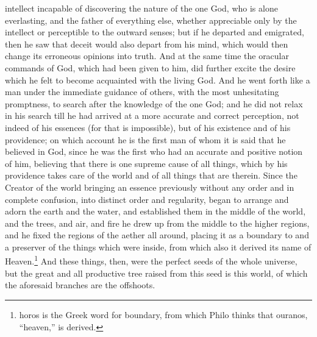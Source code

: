intellect incapable of discovering the nature of the one God, who is alone everlasting, and the
father of everything else, whether appreciable only by the intellect or perceptible to the outward
senses; but if he departed and emigrated, then he saw that deceit would also depart from his mind,
which would then change its erroneous opinions into truth. And at the same time the oracular
commands of God, which had been given to him, did further excite the desire which he felt to
become acquainted with the living God. And he went forth like a man under the immediate guidance
of others, with the most unhesitating promptness, to search after the knowledge of the one God;
and he did not relax in his search till he had arrived at a more accurate and correct perception, not
indeed of his essences (for that is impossible), but of his existence and of his providence; on
which account he is the first man of whom it is said that he believed in God, since he was the first
who had an accurate and positive notion of him, believing that there is one supreme cause of all
things, which by his providence takes care of the world and of all things that are therein. Since the
Creator of the world bringing an essence previously without any order and in complete confusion,
into distinct order and regularity, began to arrange and adorn the earth and the water, and
established them in the middle of the world, and the trees, and air, and fire he drew up from the
middle to the higher regions, and he fixed the regions of the aether all around, placing it as a
boundary to and a preserver of the things which were inside, from which also it derived its name of
Heaven.\footnote{horos is the Greek word for boundary, from which Philo thinks that ouranos, ``heaven,'' is derived.} And
these things, then, were the perfect seeds of the whole universe, but the great and all productive
tree raised from this seed is this world, of which the aforesaid branches are the offshoots.

